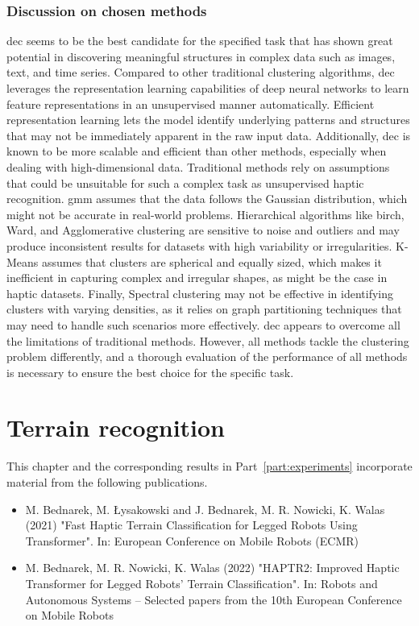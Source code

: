 \documentclass[a4paper, 10pt, twoside]{report}
\begin{document}
\subsection{Discussion on chosen methods}
\acrshort{dec} seems to be the best candidate for the specified task that has shown great potential in discovering meaningful structures in complex data such as images, text, and time series. Compared to other traditional clustering algorithms, \acrshort{dec} leverages the representation learning capabilities of deep neural networks to learn feature representations in an unsupervised manner automatically. Efficient representation learning lets the model identify underlying patterns and structures that may not be immediately apparent in the raw input data. Additionally, \acrshort{dec} is known to be more scalable and efficient than other methods, especially when dealing with high-dimensional data. Traditional methods rely on assumptions that could be unsuitable for such a complex task as unsupervised haptic recognition. \acrshort{gmm} assumes that the data follows the Gaussian distribution, which might not be accurate in real-world problems. Hierarchical algorithms like \acrshort{birch}, Ward, and Agglomerative clustering are sensitive to noise and outliers and may produce inconsistent results for datasets with high variability or irregularities. K-Means assumes that clusters are spherical and equally sized, which makes it inefficient in capturing complex and irregular shapes, as might be the case in haptic datasets. Finally, Spectral clustering may not be effective in identifying clusters with varying densities, as it relies on graph partitioning techniques that may need to handle such scenarios more effectively. \acrshort{dec} appears to overcome all the limitations of traditional methods. However, all methods tackle the clustering problem differently, and a thorough evaluation of the performance of all methods is necessary to ensure the best choice for the specific task. 

\chapter{Terrain recognition}
\label{part:methods:terrain}

\begin{notefromauthor}
    This chapter and the corresponding results in Part~\ref{part:experiments} incorporate material from the following publications.
    \begin{itemize}
        \item {} M. Bednarek, M. Łysakowski and J. Bednarek, M. R. Nowicki, K. Walas (2021) "Fast Haptic Terrain Classification for Legged Robots Using Transformer". In: European Conference on Mobile Robots (ECMR)
        \item {} M. Bednarek, M. R. Nowicki, K. Walas (2022) "HAPTR2: Improved Haptic Transformer for Legged Robots' Terrain Classification". In: Robots and Autonomous Systems -- Selected papers from the 10th European Conference on Mobile Robots
    \end{itemize}
\end{notefromauthor}
\end{document}

